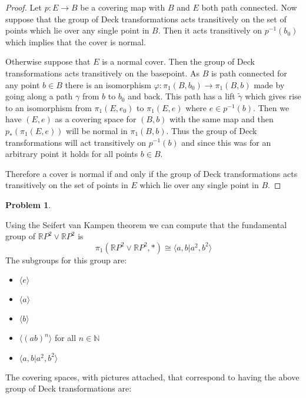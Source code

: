 \documentclass[10pt]{article}
\newcommand{\sk}{\vskip 10mm}
\newcommand{\bb}[1]{\mathbb{#1}}
\theoremstyle{plain}
\newtheorem{problem}{Problem}
\theoremstyle{remark}
\begin{document}
\begin{proof}
  Let $p:E\rightarrow B$ be a covering map with $B$ and $E$ both path connected. Now
  suppose that the group of Deck transformations acts transitively
  on the set of points which lie over any single point in $B$. Then
  it acts transitively on $p^{-1}(b_0)$ which implies that the
  cover is normal.

  Otherwise suppose that $E$ is a normal cover. Then the group of Deck
  transformations acts transitively on the basepoint. As
  $B$ is path connected for any point $b\in B$ there is
  an isomorphism  $\varphi:\pi_1(B,b_0)\rightarrow \pi_1(B,b)$ made by going along
  a path $\gamma$ from $b$ to $b_0$ and back. This path has a lift
  $\widetilde{\gamma}$ which gives rise to an isomorphism from
  $\pi_1(E,e_0)$ to $\pi_1(E,e)$ where $e\in p^{-1}(b)$. Then we
  have $(E,e)$ as a covering space for $(B,b)$ with the
  same map and then $p_*(\pi_1(E,e))$ will be normal in
  $\pi_1(B,b)$. Thus the group of Deck transformations will
  act transitively on $p^{-1}(b)$ and since this was for
  an arbitrary point it holds for all points $b\in B$.

  Therefore a cover is normal if and only if the group of
  Deck transformations acts transitively on the set of points
  in $E$ which lie over any single point in $B$.
\end{proof}

\sk

\begin{problem} %
  
\end{problem}

Using the Seifert van Kampen theorem we can compute that the
fundamental group of $\bb{R}P^2\vee \bb{R}P^2$ is
\[ \pi_1(\bb{R}P^2\vee \bb{R}P^2,*)\cong \langle a,b|a^2,b^2\rangle\]
The subgroups for this group are:
\begin{itemize}
\item $\langle e\rangle$
\item $\langle a\rangle$
\item $\langle b\rangle$
\item $\langle (ab)^n\rangle$ for all $n\in \bb{N}$
\item $\langle a,b|a^2,b^2\rangle$
\end{itemize}

The covering spaces, with pictures attached, that correspond to having
the above group of Deck transformations are:
\end{document}
